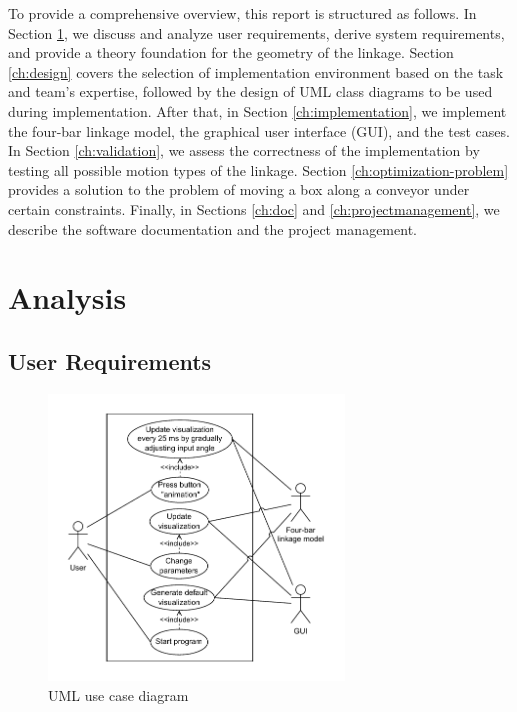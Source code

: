 \documentclass{article}
\begin{document}
To provide a comprehensive overview, this report is structured as follows. In Section \ref{ch:analysis}, we discuss and analyze user requirements, derive system requirements, and provide a theory foundation for the geometry of the linkage. Section \ref{ch:design} covers the selection of implementation environment based on the task and team's expertise, followed by the design of UML class diagrams to be used during implementation. After that, in Section \ref{ch:implementation}, we implement the four-bar linkage model, the graphical user interface (GUI), and the test cases. In Section \ref{ch:validation}, we assess the correctness of the implementation by testing all possible motion types of the linkage. Section \ref{ch:optimization-problem} provides a solution to the problem of moving a box along a conveyor under certain constraints. Finally, in Sections \ref{ch:doc} and \ref{ch:projectmanagement}, we describe the software documentation and the project management.

\section{Analysis} \label{ch:analysis}

\subsection{User Requirements}\label{ch:user_requirements}

\begin{figure}[h]
	\centering
	\includegraphics[width=0.7\textwidth]{./figures/uml_use_case.pdf}
	\caption{UML use case diagram}
	\label{fig:use_case}
\end{figure}
\end{document}
